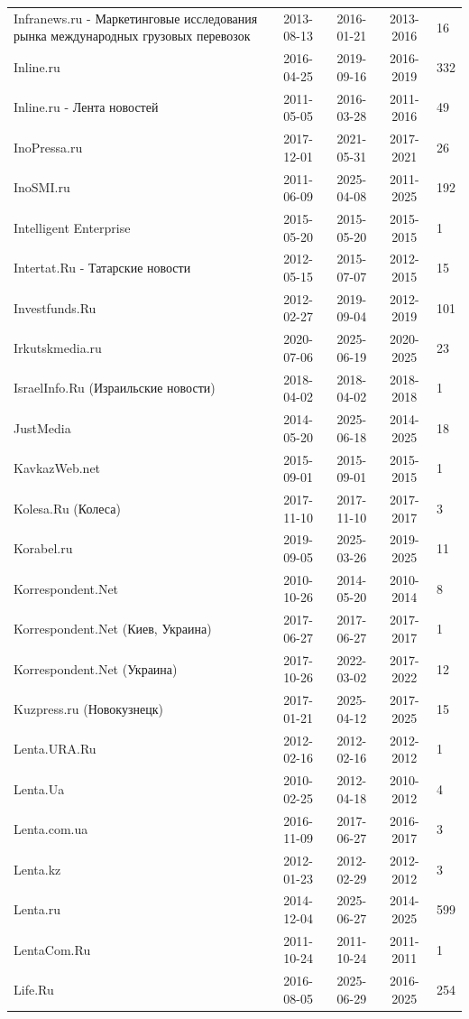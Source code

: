\begin{longtable}{p{6cm}cccp{2cm}}
Infranews.ru - Маркетинговые исследования рынка международных грузовых перевозок & 2013-08-13 & 2016-01-21 & 2013-2016 & 16\\
Inline.ru & 2016-04-25 & 2019-09-16 & 2016-2019 & 332\\
Inline.ru - Лента новостей & 2011-05-05 & 2016-03-28 & 2011-2016 & 49\\
InoPressa.ru & 2017-12-01 & 2021-05-31 & 2017-2021 & 26\\
InoSMI.ru & 2011-06-09 & 2025-04-08 & 2011-2025 & 192\\
Intelligent Enterprise & 2015-05-20 & 2015-05-20 & 2015-2015 & 1\\
Intertat.Ru - Татарские новости & 2012-05-15 & 2015-07-07 & 2012-2015 & 15\\
Investfunds.Ru & 2012-02-27 & 2019-09-04 & 2012-2019 & 101\\
Irkutskmedia.ru & 2020-07-06 & 2025-06-19 & 2020-2025 & 23\\
IsraelInfo.Ru (Израильские новости) & 2018-04-02 & 2018-04-02 & 2018-2018 & 1\\
JustMedia & 2014-05-20 & 2025-06-18 & 2014-2025 & 18\\
KavkazWeb.net & 2015-09-01 & 2015-09-01 & 2015-2015 & 1\\
Kolesa.Ru (Колеса) & 2017-11-10 & 2017-11-10 & 2017-2017 & 3\\
Korabel.ru & 2019-09-05 & 2025-03-26 & 2019-2025 & 11\\
Korrespondent.Net & 2010-10-26 & 2014-05-20 & 2010-2014 & 8\\
Korrespondent.Net (Киев, Украина) & 2017-06-27 & 2017-06-27 & 2017-2017 & 1\\
Korrespondent.Net (Украина) & 2017-10-26 & 2022-03-02 & 2017-2022 & 12\\
Kuzpress.ru (Новокузнецк) & 2017-01-21 & 2025-04-12 & 2017-2025 & 15\\
Lenta.URA.Ru & 2012-02-16 & 2012-02-16 & 2012-2012 & 1\\
Lenta.Ua & 2010-02-25 & 2012-04-18 & 2010-2012 & 4\\
Lenta.com.ua & 2016-11-09 & 2017-06-27 & 2016-2017 & 3\\
Lenta.kz & 2012-01-23 & 2012-02-29 & 2012-2012 & 3\\
Lenta.ru & 2014-12-04 & 2025-06-27 & 2014-2025 & 599\\
LentaCom.Ru & 2011-10-24 & 2011-10-24 & 2011-2011 & 1\\
Life.Ru & 2016-08-05 & 2025-06-29 & 2016-2025 & 254\\

\end{longtable}
